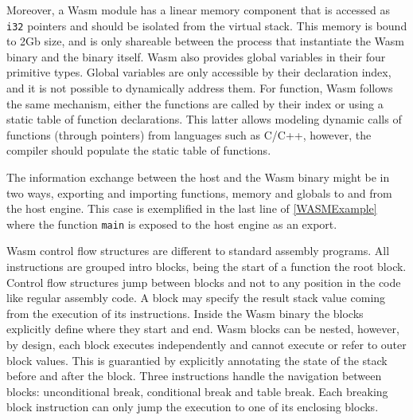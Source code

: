 Moreover, a Wasm module has a linear memory component that is accessed as \texttt{i32} pointers and should be isolated from the virtual stack. This memory is bound to 2Gb size, and is only shareable between the process that instantiate the Wasm binary and the binary itself. Wasm also provides global variables in their four primitive types. Global variables are only accessible by their declaration index, and it is not possible to dynamically address them. For function, Wasm follows the same mechanism, either the functions are called by their index or using a static table of function declarations. This latter allows modeling dynamic calls of functions (through pointers) from languages such as C/C++, however, the compiler should populate the static table of functions.

The information exchange between the host and the Wasm binary might be in two ways, exporting and importing functions, memory and globals to and from the host engine. This case is exemplified in the last line of \autoref{WASMExample} where the function \texttt{main} is exposed to the host engine as an export. 

Wasm control flow structures are different to standard assembly programs. All instructions are grouped intro blocks, being the start of a function the root block. Control flow structures jump between blocks and not to any position in the code like regular assembly code. A block may specify the result stack value coming from the execution of its instructions. Inside the Wasm binary the blocks explicitly define where they start and end. Wasm blocks can be nested, however, by design, each block executes independently and cannot execute or refer to outer block values. This is guarantied by explicitly annotating the state of the stack before and after the block. Three instructions handle the navigation between blocks: unconditional break, conditional break and table break. Each breaking block instruction can only jump the execution to one of its enclosing blocks. 




